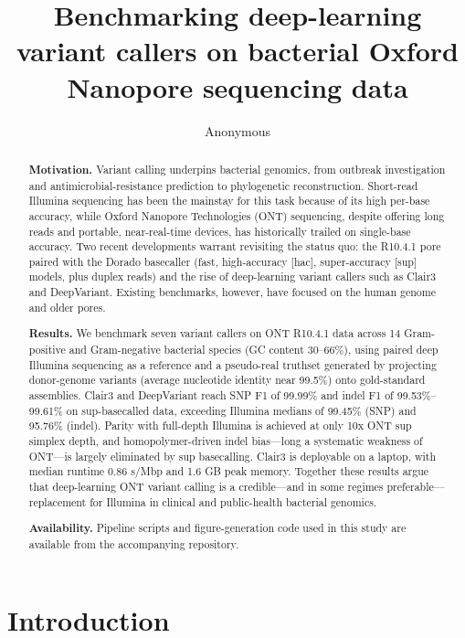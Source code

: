 \documentclass[11pt]{article}
\title{Benchmarking deep-learning variant callers on bacterial Oxford Nanopore sequencing data}
\author{Anonymous}
\date{}
\begin{document}
\maketitle

\begin{abstract}
\noindent\textbf{Motivation.} Variant calling underpins bacterial genomics, from outbreak investigation and antimicrobial-resistance prediction to phylogenetic reconstruction. Short-read Illumina sequencing has been the mainstay for this task because of its high per-base accuracy, while Oxford Nanopore Technologies (ONT) sequencing, despite offering long reads and portable, near-real-time devices, has historically trailed on single-base accuracy. Two recent developments warrant revisiting the status quo: the R10.4.1 pore paired with the Dorado basecaller (fast, high-accuracy [hac], super-accuracy [sup] models, plus duplex reads) and the rise of deep-learning variant callers such as Clair3 and DeepVariant. Existing benchmarks, however, have focused on the human genome and older pores.

\noindent\textbf{Results.} We benchmark seven variant callers on ONT R10.4.1 data across 14 Gram-positive and Gram-negative bacterial species (GC content 30--66\%), using paired deep Illumina sequencing as a reference and a pseudo-real truthset generated by projecting donor-genome variants (average nucleotide identity near 99.5\%) onto gold-standard assemblies. Clair3 and DeepVariant reach SNP F1 of 99.99\% and indel F1 of 99.53\%--99.61\% on sup-basecalled data, exceeding Illumina medians of 99.45\% (SNP) and 95.76\% (indel). Parity with full-depth Illumina is achieved at only 10x ONT sup simplex depth, and homopolymer-driven indel bias---long a systematic weakness of ONT---is largely eliminated by sup basecalling. Clair3 is deployable on a laptop, with median runtime 0.86 s/Mbp and 1.6 GB peak memory. Together these results argue that deep-learning ONT variant calling is a credible---and in some regimes preferable---replacement for Illumina in clinical and public-health bacterial genomics.

\noindent\textbf{Availability.} Pipeline scripts and figure-generation code used in this study are available from the accompanying repository.
\end{abstract}

\section{Introduction}
\end{document}
